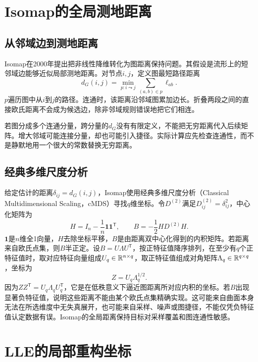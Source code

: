 \section{Isomap的全局测地距离}
\subsection{从邻域边到测地距离}
Isomap在2000年提出把非线性降维转化为图距离保持问题\cite{tenenbaum2000isomap}。其假设是流形上的短邻域边能够近似局部测地距离。对节点$i,j$，定义图最短路径距离
\begin{equation}
 d_G(i,j)=\min_{p:i\leadsto j}\sum_{(a,b)\in p}\ell_{ab}.
 \label{eq:isomap-graph-distance}
\end{equation}
$p$遍历图中从$i$到$j$的路径。连通时，该距离沿邻域图累加边长。折叠两段之间的直接欧氏距离不会成为候选边，除非邻域规则错误地把它们相连。

若图分成多个连通分量，跨分量的$d_G$没有有限定义，不能把无穷距离代入后续矩阵。增大邻域可能连接分量，却也可能引入捷径。实际计算应先检查连通性，而不是静默地用一个很大的常数替换无穷距离。

\subsection{经典多维尺度分析}
给定估计的距离$\delta_{ij}=d_G(i,j)$，Isomap使用经典多维尺度分析（Classical Multidimensional Scaling，cMDS）寻找$q$维坐标。令$D^{(2)}$满足$D^{(2)}_{ij}=\delta_{ij}^2$，中心化矩阵为
\begin{equation}
 H=I_n-\frac1n\bm1\bm1^{\mathsf T},
 \qquad B=-\frac12HD^{(2)}H .
 \label{eq:isomap-cmds}
\end{equation}
$\bm1$是$n$维全1向量，$H$去除坐标平移，$B$是由距离双中心化得到的内积矩阵。若距离来自欧氏点集，则$B$半正定。设$B=U\Lambda U^{\mathsf T}$，按正特征值降序排列，在至少有$q$个正特征值时，取对应特征向量组成$U_q\in\mathbb{R}^{n\times q}$，取正特征值组成对角矩阵$\Lambda_q\in\mathbb{R}^{q\times q}$，坐标为
\begin{equation}
 Z=U_q\Lambda_q^{1/2}.
 \label{eq:isomap-coordinates}
\end{equation}
因为$ZZ^{\mathsf T}=U_q\Lambda_qU_q^{\mathsf T}$，它是在低秩意义下逼近图距离所对应内积的坐标。若$B$出现显著负特征值，说明这些距离不能由某个欧氏点集精确实现。这可能来自曲面本身无法在所选维度中无失真展开，也可能来自采样、噪声或图捷径，不能仅凭负特征值认定数据有误。Isomap的全局距离保持目标对采样覆盖和图连通性敏感。

\section{LLE的局部重构坐标}
